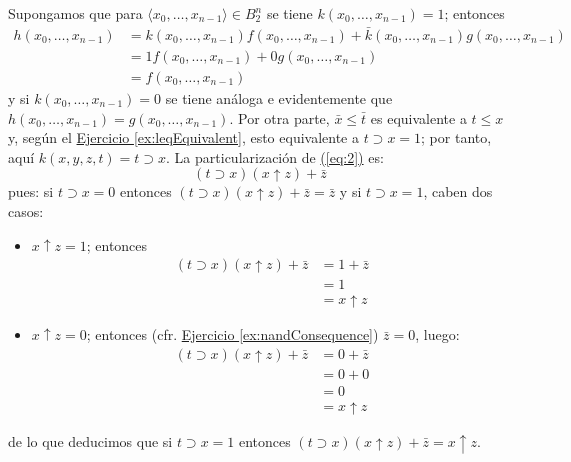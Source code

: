   \begin{solution}
    Supongamos que para
    $\langle x_{0},\ldots,x_{n-1}\rangle\in B_{2}^{n}$ se tiene
    $k(x_{0},\ldots,x_{n-1})=1$; entonces
    \begin{align*}
      h(x_{0},\ldots,x_{n-1})&=k(x_{0},\ldots,x_{n-1})f(x_{0},\ldots,x_{n-1})
                            +\bar{k}(x_{0},\ldots,x_{n-1})g(x_{0},\ldots,x_{n-1})\\
                           &=1f(x_{0},\ldots,x_{n-1})
                            +0g(x_{0},\ldots,x_{n-1})\\
                           &=f(x_{0},\ldots,x_{n-1})
    \end{align*}
    y si $k(x_{0},\ldots,x_{n-1})=0$ se tiene análoga e evidentemente
    que $h(x_{0},\ldots,x_{n-1})=g(x_{0},\ldots,x_{n-1})$. Por otra
    parte, $\bar{x}\leq\bar{t}$ es equivalente a $t\leq x$ y, según el
    \hyperref[ex:leqEquivalent]{Ejercicio \ref*{ex:leqEquivalent}},
    esto equivalente a $t\supset x=1$; por tanto, aquí
    $k(x,y,z,t)=t\supset x$. La particularización de
    \hyperref[eq:2]{(\ref*{eq:2})} es:
    \begin{equation*}
      (t\supset x)(x\uparrow z)+\bar{z}
    \end{equation*}
    pues: si $t\supset x=0$ entonces
    $(t\supset x)(x\uparrow z)+\bar{z}=\bar{z}$ y si $t\supset x=1$, caben dos
    casos:
    \begin{itemize}
    \item $x\uparrow z=1$; entonces 
      \begin{align*}
        (t\supset x)(x\uparrow z)+\bar{z}&=1+\bar{z}\\
                       &=1\\
                       &=x\uparrow z
      \end{align*}
    \item $x\uparrow z=0$; entonces
      (cfr. \hyperref[ex:nandConsequence]{Ejercicio
        \ref*{ex:nandConsequence}}) $\bar{z}=0$, luego:
      \begin{align*}
        (t\supset x)(x\uparrow z)+\bar{z}&=0+\bar{z}\\
                       &=0+0\\
                       &=0\\
                       &=x\uparrow z
      \end{align*}
    \end{itemize}
    de lo que deducimos que si $t\supset x=1$ entonces
    $(t\supset x)(x\uparrow z)+\bar{z}=x\uparrow z$.
  \end{solution}

